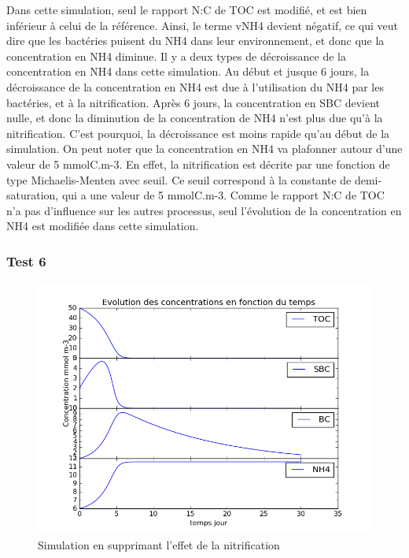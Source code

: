 \par{
Dans cette simulation, seul le rapport N:C de TOC est modifi\'e, et est bien inf\'erieur \`a celui de la r\'ef\'erence. Ainsi, le terme vNH4 devient n\'egatif, ce qui veut dire que les bact\'eries puisent du NH4 dans leur environnement, et donc que la concentration en NH4 diminue. Il y a deux types de d\'ecroissance de la concentration en NH4 dans cette simulation. Au d\'ebut et jusque 6 jours, la d\'ecroissance de la concentration en NH4 est due \`a l'utilisation du NH4 par les bact\'eries, et \`a la nitrification. Apr\`es 6 jours, la concentration en SBC devient nulle, et donc la diminution de la concentration de NH4 n'est plus due qu'\`a la nitrification. C'est pourquoi, la d\'ecroissance est moins rapide qu'au d\'ebut de la simulation. On peut noter que la concentration en NH4 va plafonner autour d'une valeur de 5 mmolC.m-3. En effet, la nitrification est d\'ecrite par une fonction de type Michaelis-Menten avec seuil. Ce seuil correspond \`a la constante de demi-saturation, qui a une valeur de 5 mmolC.m-3. Comme le rapport N:C de TOC n'a pas d'influence sur les autres processus, seul l'\'evolution de la concentration en NH4 est modifi\'ee dans cette simulation.
}

\subsubsection{Test 6}

\begin{figure}[h!]
  \includegraphics[width=\textwidth]{partie1/Test6.png}
  \caption{Simulation en supprimant l'effet de la nitrification
  }
  \label{fig:partie1test6}
\end{figure}

